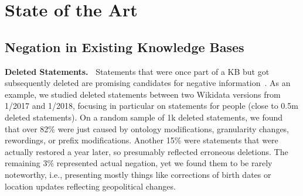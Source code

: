 \section{State of the Art}
\label{sec:related}


\subsection{Negation in Existing Knowledge Bases}
\label{sec:existing}




\noindent
\textbf{Deleted Statements.\ }
Statements that were once part of a KB but got subsequently deleted are promising candidates for negative information~\cite{edithistory2019}. As an example, we studied deleted statements between two Wikidata versions from 1/2017 and 1/2018, focusing in particular on statements for people (close to 0.5m deleted statements). On a random sample of 1k deleted statements, we found that over 82\% were just caused by ontology modifications, granularity changes, rewordings, or prefix modifications. %
Another 15\% were statements that were actually restored a year later, so presumably reflected erroneous deletions. The remaining 3\% represented actual negation, yet we found them to be rarely noteworthy, i.e., presenting mostly things like corrections of birth dates or location updates reflecting geopolitical changes.

